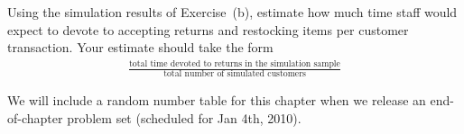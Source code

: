 \begin{exercise}
Using the simulation results of Exercise~(b), estimate how much time staff would expect to devote to accepting returns and restocking items per customer transaction. Your estimate should take the form
\begin{eqnarray*}
\frac{\text{total time devoted to returns in the simulation sample}}
	{\text{total number of simulated customers}}
\end{eqnarray*}
\end{exercise}

\vspace{5cm}

We will include a random number table for this chapter when we release an end-of-chapter problem set (scheduled for Jan 4th, 2010).


